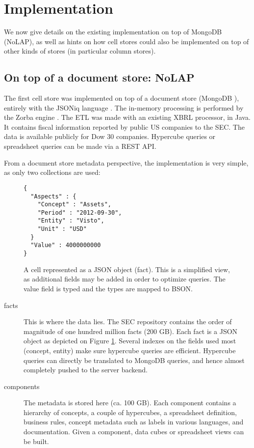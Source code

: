 \documentclass{acm_proc_article-sp}
\begin{document}
\section{Implementation}
We now give details on the existing implementation on top of MongoDB (NoLAP), as well as hints on how cell stores could also be implemented on top of other kinds of stores (in particular column stores).
\label{section-implementation}

\subsection{On top of a document store: NoLAP}

The first cell store was implemented on top of a document store (MongoDB \cite{MongoDB}), entirely with the JSONiq language \cite{JSONiq}. The in-memory processing is performed by the Zorba engine \cite{Zorba}. The ETL was made with an existing XBRL processor, in Java. It contains fiscal information reported by public US companies to the SEC. The data is available publicly \cite{SECXBRL.info} for Dow 30 companies. Hypercube queries or spreadsheet queries can be made via a REST API.

From a document store metadata perspective, the implementation is very simple, as only two collections are used:


\begin{figure}
\caption{A cell represented as a JSON object (fact). This is a simplified view, as additional fields may be added in order to optimize queries. The value field is typed and the types are mapped to BSON.}
\label{fig-fact}
\begin{lstlisting}
{
  "Aspects" : {
    "Concept" : "Assets",
    "Period" : "2012-09-30",
    "Entity" : "Visto",
    "Unit" : "USD"
  }
  "Value" : 4000000000
}
\end{lstlisting}
\end{figure}


\begin{description}
\item[facts] This is where the data lies. The SEC repository \cite{SECXBRL.info} contains the order of magnitude of one hundred million facts (200 GB). Each fact is a JSON object as depicted on Figure \ref{fig-fact}. Several indexes on the fields used most (concept, entity) make sure hypercube queries are efficient. Hypercube queries can directly be translated to MongoDB queries, and hence almost completely pushed to the server backend.
\item[components] The metadata is stored here (ca. 100 GB). Each component contains a hierarchy of concepts, a couple of hypercubes, a spreadsheet definition, business rules, concept metadata such as labels in various languages, and documentation. Given a component, data cubes or spreadsheet views can be built.
\end{description}
\end{document}

